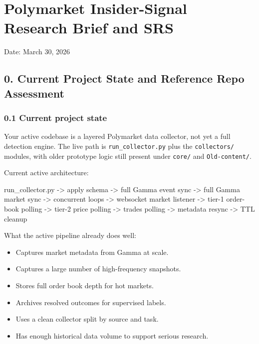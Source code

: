 \documentclass[
]{article}
\author{}
\date{}
\newenvironment{Shaded}{}{}
\newcommand{\NormalTok}[1]{#1}
\providecommand{\tightlist}{%
  \setlength{\itemsep}{0pt}\setlength{\parskip}{0pt}}
\begin{document}
\section{Polymarket Insider-Signal Research Brief and
SRS}\label{polymarket-insider-signal-research-brief-and-srs}

Date: March 30, 2026

\subsection{0. Current Project State and Reference Repo
Assessment}\label{0-current-project-state-and-reference-repo-assessment}

\subsubsection{0.1 Current project
state}\label{01-current-project-state}

Your active codebase is a layered Polymarket data collector, not yet a
full detection engine. The live path is \texttt{run\_collector.py} plus
the \texttt{collectors/} modules, with older prototype logic still
present under \texttt{core/} and \texttt{Old-content/}.

Current active architecture:

\begin{Shaded}
\begin{Highlighting}[]
\NormalTok{run\_collector.py}
\NormalTok{  {-}\textgreater{} apply schema}
\NormalTok{  {-}\textgreater{} full Gamma event sync}
\NormalTok{  {-}\textgreater{} full Gamma market sync}
\NormalTok{  {-}\textgreater{} concurrent loops}
\NormalTok{     {-}\textgreater{} websocket market listener}
\NormalTok{     {-}\textgreater{} tier{-}1 order{-}book polling}
\NormalTok{     {-}\textgreater{} tier{-}2 price polling}
\NormalTok{     {-}\textgreater{} trades polling}
\NormalTok{     {-}\textgreater{} metadata resync}
\NormalTok{     {-}\textgreater{} TTL cleanup}
\end{Highlighting}
\end{Shaded}

What the active pipeline already does well:

\begin{itemize}
\tightlist
\item
  Captures market metadata from Gamma at scale.
\item
  Captures a large number of high-frequency snapshots.
\item
  Stores full order book depth for hot markets.
\item
  Archives resolved outcomes for supervised labels.
\item
  Uses a clean collector split by source and task.
\item
  Has enough historical data volume to support serious research.
\end{itemize}
\end{document}
